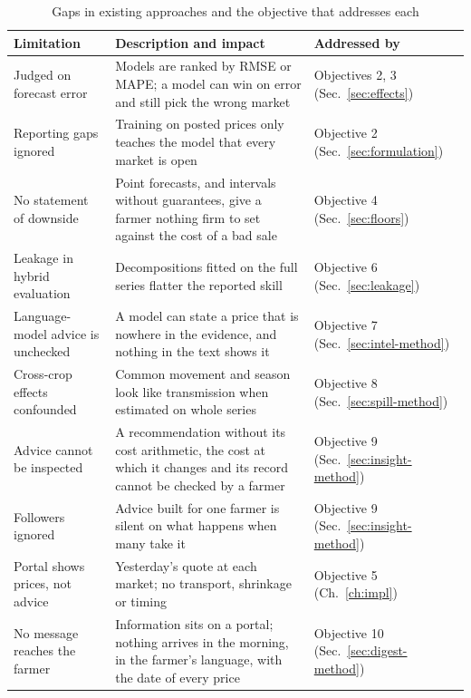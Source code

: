 \begin{table}[!t]
    \centering
    \caption{Gaps in existing approaches and the objective that addresses each}
    \label{tab:gaps}
    \small
    \begin{tabular}{|p{4.6cm}|p{6.6cm}|p{3cm}|}
    \hline
    \textbf{Limitation} & \textbf{Description and impact} & \textbf{Addressed by} \\ \hline
    Judged on forecast error & Models are ranked by RMSE or MAPE; a model can win on error and still pick the wrong market~\cite{elmachtoub2022,mandi2024} & Objectives 2, 3 (Sec.~\ref{sec:effects}) \\ \hline
    Reporting gaps ignored & Training on posted prices only teaches the model that every market is open~\cite{rubin1976,che2018} & Objective 2 (Sec.~\ref{sec:formulation}) \\ \hline
    No statement of downside & Point forecasts, and intervals without guarantees, give a farmer nothing firm to set against the cost of a bad sale~\cite{kde2024,gibbs2021} & Objective 4 (Sec.~\ref{sec:floors}) \\ \hline
    Leakage in hybrid evaluation & Decompositions fitted on the full series flatter the reported skill~\cite{jaiswal2025,sathe2025,bergmeir2012} & Objective 6 (Sec.~\ref{sec:leakage}) \\ \hline
    Language-model advice is unchecked & A model can state a price that is nowhere in the evidence, and nothing in the text shows it & Objective 7 (Sec.~\ref{sec:intel-method}) \\ \hline
    Cross-crop effects confounded & Common movement and season look like transmission when estimated on whole series & Objective 8 (Sec.~\ref{sec:spill-method}) \\ \hline
    Advice cannot be inspected & A recommendation without its cost arithmetic, the cost at which it changes and its record cannot be checked by a farmer & Objective 9 (Sec.~\ref{sec:insight-method}) \\ \hline
    Followers ignored & Advice built for one farmer is silent on what happens when many take it & Objective 9 (Sec.~\ref{sec:insight-method}) \\ \hline
    Portal shows prices, not advice & Yesterday's quote at each market; no transport, shrinkage or timing~\cite{agmarknet} & Objective 5 (Ch.~\ref{ch:impl}) \\ \hline
    No message reaches the farmer & Information sits on a portal; nothing arrives in the morning, in the farmer's language, with the date of every price~\cite{fafchamps2012} & Objective 10 (Sec.~\ref{sec:digest-method}) \\ \hline
    \end{tabular}
\end{table}

